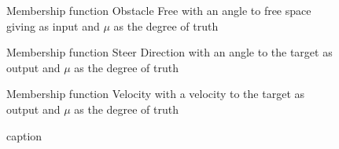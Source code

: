 \documentclass[../Head/Main.tex]{subfiles}
\begin{document}
\begin{figure}[H]
	\centering
	
	\caption{Membership function Obstacle Free with an angle to free space giving as input and  $\mu$ as the degree of truth}
	\label{fig:MSF_Obstacle_free}
\end{figure}

\begin{figure}[H]
	\centering
	
	\caption{Membership function Steer Direction with an angle to the target as output and $\mu$ as the degree of truth}
	\label{fig:MSF_Steer_direction}
\end{figure}

\begin{figure}[H]
	\centering
	
	\caption{Membership function Velocity with a velocity to the target as output and $\mu$ as the degree of truth}
	\caption{caption}
	\label{fig:MSF_Velocity}
\end{figure}
\end{document}

